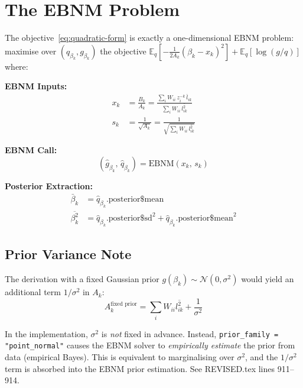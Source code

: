 \documentclass[11pt]{article}
\begin{document}
\section{The EBNM Problem}\label{sec:ebnm}

The objective~\eqref{eq:quadratic-form} is exactly a one-dimensional EBNM
problem: maximise over $(q_{\beta_k}, g_{\beta_k})$ the objective
$\mathbb{E}_q[-\frac{1}{2A_k}(\beta_k - x_k)^2] + \mathbb{E}_q[\log(g/q)]$
where:

\begin{ebnmbox}
\textbf{EBNM Inputs:}
\begin{align}
  x_k &= \frac{B_k}{A_k}
  = \frac{\displaystyle\sum_i W_{ii}\,z_i^{-k}\,\bar{l}_{ik}}
         {\displaystyle\sum_i W_{ii}\,\overline{l^2_{ik}}}
  \label{eq:xk} \\[6pt]
  s_k &= \frac{1}{\sqrt{A_k}}
  = \frac{1}{\sqrt{\displaystyle\sum_i W_{ii}\,\overline{l^2_{ik}}}}
  \label{eq:sk}
\end{align}

\textbf{EBNM Call:}
\[
  (\hat{g}_{\beta_k},\,\hat{q}_{\beta_k}) = \mathrm{EBNM}(x_k,\, s_k)
\]

\textbf{Posterior Extraction:}
\begin{align}
  \bar{\beta}_k &= \hat{q}_{\beta_k}\text{.posterior\$mean}
  \label{eq:beta-mean} \\
  \overline{\beta^2_k} &= \hat{q}_{\beta_k}\text{.posterior\$sd}^2
                          + \hat{q}_{\beta_k}\text{.posterior\$mean}^2
  \label{eq:beta-sec}
\end{align}
\end{ebnmbox}

\subsection{Prior Variance Note}

The derivation with a fixed Gaussian prior $g(\beta_k) \sim \mathcal{N}(0, \sigma^2)$
would yield an additional term $1/\sigma^2$ in $A_k$:
\begin{equation}
  A_k^{\text{fixed prior}} = \sum_i W_{ii}\overline{l^2_{ik}} + \frac{1}{\sigma^2}
  \label{eq:Ak-with-prior}
\end{equation}

In the implementation, $\sigma^2$ is \emph{not} fixed in advance.  Instead,
\texttt{prior\_family = "point\_normal"} causes the EBNM solver to
\emph{empirically estimate} the prior from data (empirical Bayes).  This is
equivalent to marginalising over $\sigma^2$, and the $1/\sigma^2$ term is
absorbed into the EBNM prior estimation.  See REVISED.tex lines 911--914.
\end{document}

